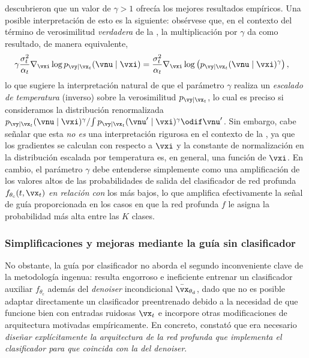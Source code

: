 \documentclass[../../book-main_es.tex]{subfiles}
\begin{document}
\citet{Dhariwal2021-hg} descubrieron que un valor de $\gamma > 1$ ofrecía
los mejores resultados empíricos.
Una posible interpretación de esto es la siguiente: obsérvese que, en el contexto del
término de verosimilitud \textit{verdadera} de la
, la multiplicación por $\gamma$
da como resultado, de manera equivalente,
\begin{align}
    \gamma\frac{\sigma_t^2}{\alpha_t} \nabla_{\vxi}\log p_{\vy \mid
    \vx_t}(\vnu\mid
    \vxi)
    &=
    \frac{\sigma_t^2}{\alpha_t} \nabla_{\vxi}\log \left(
        p_{\vy \mid \vx_t}(\vnu\mid \vxi)^\gamma
    \right), %
\end{align}
lo que sugiere la interpretación natural de que el parámetro $\gamma$ realiza
un \textit{escalado de temperatura} (inverso) sobre la verosimilitud
$p_{\vy \mid \vx_t}$, lo cual es preciso si consideramos la distribución
renormalizada
$ { p_{\vy \mid \vx_t}(\vnu\mid \vxi)^\gamma } / { \int p_{\vy \mid
    \vx_t}(\vnu'\mid
\vxi)^\gamma \odif \vnu' } $.
Sin embargo, cabe señalar que esta \textit{no es} una interpretación rigurosa en el contexto
de la , ya que los
gradientes se calculan con respecto a $\vxi$ y la constante de normalización en
la distribución escalada por temperatura es, en general, una función de $\vxi$.
En cambio, el parámetro $\gamma$ debe entenderse simplemente como una amplificación de los 
valores altos de las probabilidades de salida del clasificador de red profunda 
$f_{\theta_{\mathrm{c}}}(t, \vx_t)$ \textit{en relación con} los más bajos,
lo que amplifica efectivamente la señal de guía proporcionada en los casos en que la red profunda
$f$ le asigna la probabilidad más alta entre las $K$ clases.

\subsubsection{Simplificaciones y mejoras mediante la guía sin clasificador}

No obstante, la guía por clasificador no aborda el segundo inconveniente clave de
la metodología ingenua: resulta engorroso e ineficiente
entrenar un clasificador auxiliar $f_{\theta_{\mathrm{c}}}$ además
del \textit{denoiser} incondicional
$\bar{\vx}_{\theta_{\mathrm{d}}}$, dado
que no es posible adaptar directamente un clasificador preentrenado
debido a la necesidad de que funcione bien con entradas ruidosas $\vx_t$ e incorpore
otras modificaciones de arquitectura motivadas empíricamente.
En concreto, \citet{Dhariwal2021-hg} constató que era necesario
\textit{diseñar explícitamente
    la arquitectura de la red profunda que implementa el
    clasificador para que coincida
con la del \textit{denoiser}}.
\end{document}
